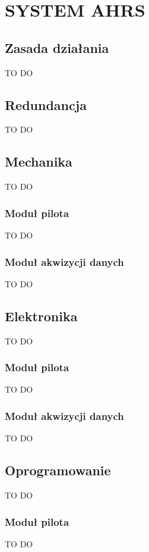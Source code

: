 \documentclass[a4paper, 12pt, twoside]{article}
\begin{document}
\newpage
\vspace*{1.5 cm}
\section{SYSTEM AHRS}
\vspace{3.0 cm}

\vspace{1.0 cm}
\subsection{Zasada działania}
TO DO
\subsection{Redundancja}
TO DO

\subsection{Mechanika}
TO DO

\subsubsection{Moduł pilota}
TO DO

\subsubsection{Moduł akwizycji danych}
TO DO

\subsection{Elektronika}
TO DO
\subsubsection{Moduł pilota}
TO DO

\subsubsection{Moduł akwizycji danych}
TO DO

\subsection{Oprogramowanie}
TO DO

\subsubsection{Moduł pilota}
TO DO
\end{document}
